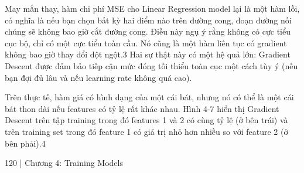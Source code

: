 May mắn thay, hàm chi phí MSE cho Linear Regression model lại là một hàm lồi, có nghĩa là nếu bạn chọn bất kỳ hai điểm nào trên đường cong, đoạn đường nối chúng sẽ không bao giờ cắt đường cong. Điều này ngụ ý rằng không có cực tiểu cục bộ, chỉ có một cực tiểu toàn cầu. Nó cũng là một hàm liên tục có gradient không bao giờ thay đổi đột ngột.3 Hai sự thật này có một hệ quả lớn: Gradient Descent được đảm bảo tiếp cận mức đóng tối thiểu toàn cục một cách tùy ý (nếu bạn đợi đủ lâu và nếu learning rate không quá cao).

Trên thực tế, hàm giá có hình dạng của một cái bát, nhưng nó có thể là một cái bát thon dài nếu features có tỷ lệ rất khác nhau. Hình 4-7 hiển thị Gradient Descent trên tập training trong đó features 1 và 2 có cùng tỷ lệ (ở bên trái) và trên training set trong đó feature 1 có giá trị nhỏ hơn nhiều so với feature 2 (ở bên phải).4

120 | Chương 4: Training Models


